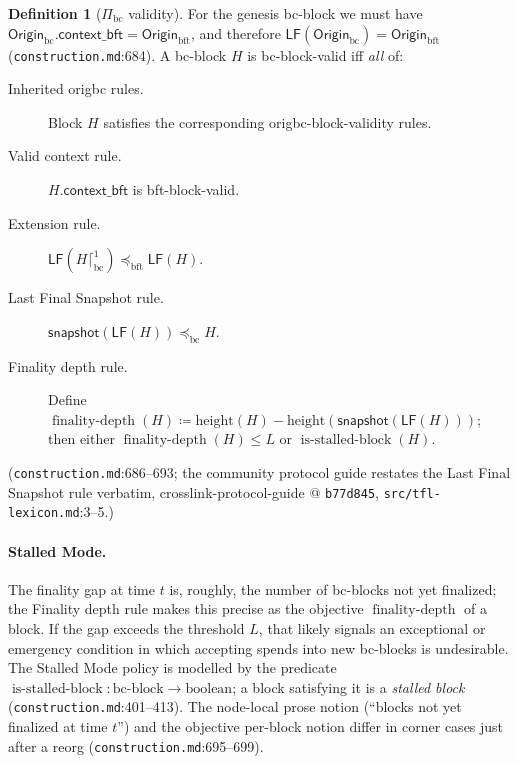 \documentclass[11pt,a4paper]{article}
\theoremstyle{definition}
\newtheorem{definition}[theorem]{Definition}
\begin{document}
\begin{definition}[$\Pi_{\mathrm{bc}}$ validity]\label{def:xl-bc-validity}
For the genesis bc-block we must have
$\mathsf{Origin}_{\mathrm{bc}}.\mathsf{context\_bft} =
\mathsf{Origin}_{\mathrm{bft}}$, and therefore
$\mathsf{LF}(\mathsf{Origin}_{\mathrm{bc}}) =
\mathsf{Origin}_{\mathrm{bft}}$ (\texttt{construction.md}:684). A
bc-block $H$ is bc-block-valid iff \emph{all} of:
\begin{description}
\item[Inherited origbc rules.] Block $H$ satisfies the corresponding
  origbc-block-validity rules.
\item[Valid context rule.] $H.\mathsf{context\_bft}$ is bft-block-valid.
\item[Extension rule.] $\mathsf{LF}(H \lceil^{1}_{\mathrm{bc}})
  \preceq_{\mathrm{bft}} \mathsf{LF}(H)$.
\item[Last Final Snapshot rule.] $\mathsf{snapshot}(\mathsf{LF}(H))
  \preceq_{\mathrm{bc}} H$.
\item[Finality depth rule.] Define
  $\operatorname{finality\text{-}depth}(H) \coloneqq \mathrm{height}(H) -
  \mathrm{height}(\mathsf{snapshot}(\mathsf{LF}(H)))$; then either
  $\operatorname{finality\text{-}depth}(H) \le L$ or
  $\operatorname{is\text{-}stalled\text{-}block}(H)$.
\end{description}
(\texttt{construction.md}:686--693; the community protocol guide restates
the Last Final Snapshot rule verbatim, crosslink-protocol-guide @
\texttt{b77d845}, \texttt{src/tfl-lexicon.md}:3--5.)
\end{definition}

\paragraph{Stalled Mode.} The finality gap at time $t$ is, roughly, the
number of bc-blocks not yet finalized; the Finality depth rule makes this
precise as the objective $\operatorname{finality\text{-}depth}$ of a
block. If the gap exceeds the threshold $L$, that likely signals an
exceptional or emergency condition in which accepting spends into new
bc-blocks is undesirable. The Stalled Mode policy is modelled by the
predicate $\operatorname{is\text{-}stalled\text{-}block} :
\text{bc-block} \to \mathrm{boolean}$; a block satisfying it is a
\emph{stalled block} (\texttt{construction.md}:401--413). The node-local
prose notion (``blocks not yet finalized at time $t$'') and the objective
per-block notion differ in corner cases just after a reorg
(\texttt{construction.md}:695--699).
\end{document}
